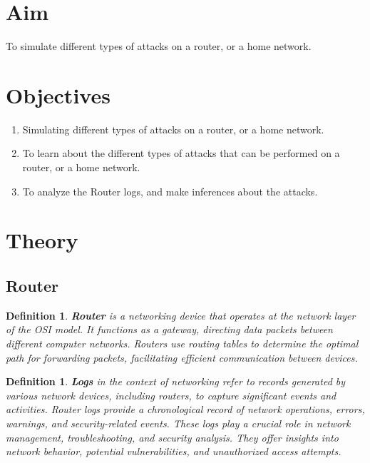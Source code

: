 \documentclass[11pt]{article}
\newtheorem{dfn}[thm]{Definition}
\begin{document}
\tableofcontents
\thispagestyle{empty}
\clearpage

\setcounter{page}{1}

\section{Aim}
To simulate different types of attacks on a router, or a home network.

\section{Objectives}
\begin{enumerate}
    \item Simulating different types of attacks on a router, or a home network.
    \item To learn about the different types of attacks that can be performed on a router, or a home network.
    \item To analyze the Router logs, and make inferences about the attacks.
\end{enumerate}

\section{Theory}

\subsection{Router}

\begin{dfn}
    \textbf{Router} is a networking device that operates at the network layer of the OSI model. It functions as a gateway, directing data packets between different computer networks. Routers use routing tables to determine the optimal path for forwarding packets, facilitating efficient communication between devices.
\end{dfn}

\begin{dfn}
    \textbf{Logs} in the context of networking refer to records generated by various network devices, including routers, to capture significant events and activities. Router logs provide a chronological record of network operations, errors, warnings, and security-related events. These logs play a crucial role in network management, troubleshooting, and security analysis. They offer insights into network behavior, potential vulnerabilities, and unauthorized access attempts.
\end{dfn}
\end{document}
